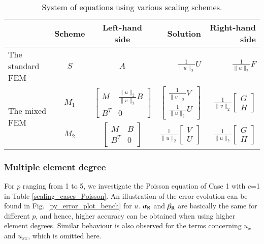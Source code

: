\documentclass[review,3p]{elsarticle}
\begin{document}
\begin{table}[!ht]
\small
\centering
\caption [sss] {System of equations using various scaling schemes.}
\label{scaling_schemes_std_and_mix_FEM} 
\begin{tabular}{l c c r r}
\hline  
 & Scheme & Left-hand side & Solution & Right-hand side \\	\hline
The standard FEM & $S$ & {$A$} & $\frac{1}{\|u\|_{2}} U$ & $\frac{1}{\|u\|_{2}} F$ \\	\hline
\multirow{3}{*}{The mixed FEM} & $M_1$ & {$\left[ \begin{array}{cc} M & \frac{\|u\|_{2}}{\|v\|_{2}} B  \\ B^T & 0 \end{array}\right]$ } & $\left[ \begin{array}{cc} \frac{1}{\|v\|_{2}} {V} \\ \frac{1}{\|u\|_{2}} {U} \end{array}\right]$ & $\frac{1}{\|v\|_{2}}\left[ \begin{array}{cc} G \\ { H} \end{array}\right]$ 	\\	\cline{2-5}
 & $M_2$ & {$\left[ \begin{array}{cc} M & B  \\ B^T & 0 \end{array}\right]$ } & $\frac{1}{\|u\|_{2}} \left[ \begin{array}{cc} {V} \\ {U} \end{array}\right]$ & $\frac{1}{\|u\|_{2}} \left[ \begin{array}{cc}  G \\ H \end{array}\right]$ \\	\hline
\end{tabular}
\end{table}

\newpage
\subsubsection{Multiple element degree}						\label{error_evolution_multiple_p}

For $p$ ranging from 1 to 5, we investigate the Poisson equation of Case 1 with $c$=1 in Table \ref{scaling_cases_Poisson}.
An illustration of the error evolution can be found in Fig.~\ref{py_error_plot_bench} for $u$. $\alpha_{\rm R}$ and $\beta_{\rm R}$ are basically the same for different $p$, and hence, higher accuracy can be obtained when using higher element degrees. Similar behaviour is also observed for the terms concerning $u_x$ and $u_{xx}$, which is omitted here.
\end{document}
